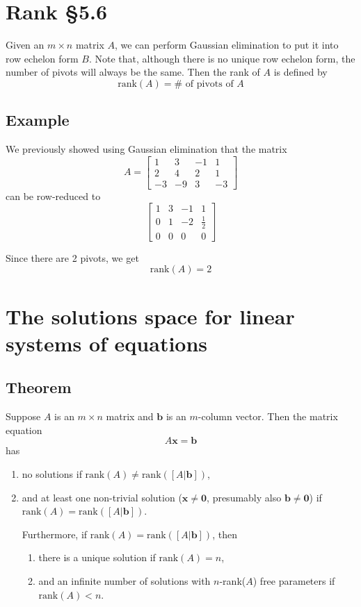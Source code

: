 \documentclass[11pt]{article}
\renewcommand{\vec}[1]{\mathbf{#1}}
\begin{document}
\section{Rank §5.6}
Given an $m \times n$ matrix $A$, we can perform Gaussian elimination to put it into row echelon form $B$. Note that, although there is no unique row echelon form, the number of pivots will always be the same. Then the rank of $A$ is defined by
\[ \text{rank}(A) = \# \text{ of pivots of } A \]

\subsection{Example}
We previously showed using Gaussian elimination that the matrix
\[
A = \begin{bmatrix}
1 & 3 & -1 & 1 \\
2 & 4 & 2 & 1 \\
-3 & -9 & 3 & -3 
\end{bmatrix}
\]
can be row-reduced to
\[
\begin{bmatrix}
1 & 3 & -1 & 1 \\
0 & 1 & -2 & \frac{1}{2} \\
0 & 0 & 0 & 0
\end{bmatrix}
\]

Since there are 2 pivots, we get
\[ \text{rank}(A) = 2 \]

\section{The solutions space for linear systems of equations}
\subsection{Theorem}
Suppose $A$ is an $m \times n$ matrix and $\vec{b}$ is an $m$-column vector. Then the matrix equation
\[ A \vec{x} = \vec{b} \]
has
\begin{enumerate}[ (i) ]
\item no solutions if $\text{rank}(A) \not = \text{rank}([A | \vec{b}] )$,
\item and at least one non-trivial solution ($\vec{x} \not = \vec{0}$, presumably also $\vec{b} \not = \vec{0}$) if $\text{rank}(A) = \text{rank}([A | \vec{b}] )$.

Furthermore, if $\text{rank}(A) = \text{rank}([A | \vec{b}] )$, then\\
\begin{enumerate}[label=(\roman{enumi}.\alph*)]
\item there is a unique solution if $\text{rank}(A) = n$,

\item and an infinite number of solutions with $n$-rank($A$) free parameters if $\text{rank}(A) < n$.
\end{enumerate}

\end{enumerate}
\end{document}
